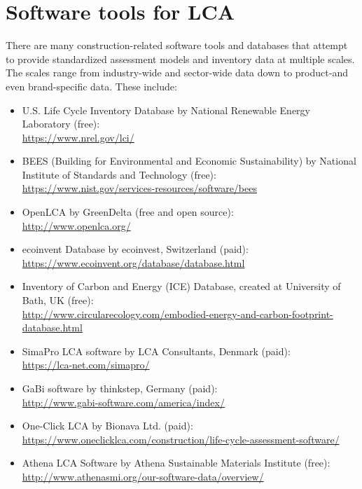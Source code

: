 \documentclass[10pt]{article}
\begin{document}
\section{Software tools for LCA} 
 
There are many construction-related software tools and databases that attempt to provide standardized assessment models and inventory data at multiple scales. The scales range from industry-wide and sector-wide data down to product-and even brand-specific data.  These include:

\begin{itemize}
\item U.S. Life Cycle Inventory Database by National Renewable Energy Laboratory (free): \\\url{https://www.nrel.gov/lci/}
\item BEES (Building for Environmental and Economic Sustainability) by National Institute of Standards and Technology (free): \\\url{https://www.nist.gov/services-resources/software/bees}
    \item OpenLCA by GreenDelta (free and open source): \\\url{http://www.openlca.org/}
    \item ecoinvent Database by ecoinvest, Switzerland (paid): \\\url{https://www.ecoinvent.org/database/database.html}
    \item Inventory of Carbon and Energy (ICE) Database, created at University of Bath, UK (free): \\\url{http://www.circularecology.com/embodied-energy-and-carbon-footprint-database.html}
    \item SimaPro LCA software by LCA Consultants, Denmark (paid): \\\url{https://lca-net.com/simapro/}
    \item GaBi software by thinkstep, Germany (paid): \\\url{http://www.gabi-software.com/america/index/}
    \item One-Click LCA by Bionava Ltd. (paid): \\\url{https://www.oneclicklca.com/construction/life-cycle-assessment-software/}
    \item Athena LCA Software by Athena Sustainable Materials Institute (free): \\\url{http://www.athenasmi.org/our-software-data/overview/}
\end{itemize}
\end{document}
